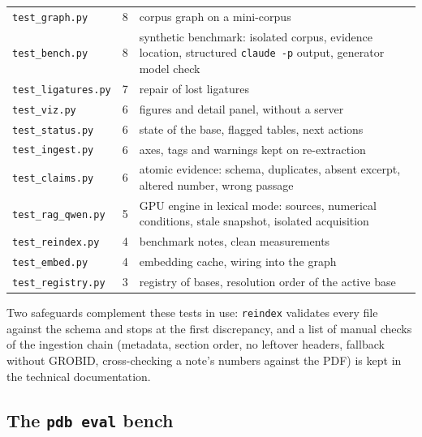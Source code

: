 \documentclass[11pt,a4paper]{article}
\newcommand{\cmd}[1]{\texttt{#1}}
\begin{document}
\begin{table}[ht]
\begin{tabularx}{\linewidth}{@{}lrL@{}}
\cmd{test\_graph.py} & 8 & corpus graph on a mini-corpus \\
\cmd{test\_bench.py} & 8 & synthetic benchmark: isolated corpus, evidence location, structured \cmd{claude -p} output, generator model check \\
\cmd{test\_ligatures.py} & 7 & repair of lost ligatures \\
\cmd{test\_viz.py} & 6 & figures and detail panel, without a server \\
\cmd{test\_status.py} & 6 & state of the base, flagged tables, next actions \\
\cmd{test\_ingest.py} & 6 & axes, tags and warnings kept on re-extraction \\
\cmd{test\_claims.py} & 6 & atomic evidence: schema, duplicates, absent excerpt, altered number, wrong passage \\
\cmd{test\_rag\_qwen.py} & 5 & GPU engine in lexical mode: sources, numerical conditions, stale snapshot, isolated acquisition \\
\cmd{test\_reindex.py} & 4 & benchmark notes, clean measurements \\
\cmd{test\_embed.py} & 4 & embedding cache, wiring into the graph \\
\cmd{test\_registry.py} & 3 & registry of bases, resolution order of the active base \\
\bottomrule
\end{tabularx}
\end{table}

Two safeguards complement these tests in use: \cmd{reindex} validates every file against the
schema and stops at the first discrepancy, and a list of manual checks of the ingestion chain
(metadata, section order, no leftover headers, fallback without GROBID, cross-checking a
note's numbers against the PDF) is kept in the technical documentation.

\subsection{The \cmd{pdb eval} bench}
\label{sec:banc}
\end{document}
